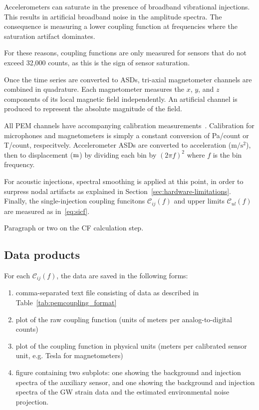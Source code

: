 Accelerometers can saturate in the presence of broadband vibrational injections.
This results in artificial broadband noise in the amplitude spectra.
The consequence is measuring a lower coupling function at frequencies where the saturation artifact dominates.

For these reasons, coupling functions are only measured for sensors that do not exceed 32,000 counts, as this is the sign of sensor saturation.

Once the time series are converted to \acp{ASD}, tri-axial magnetometer channels are combined in quadrature.
Each magnetometer measures the $x$, $y$, and $z$ components of its local magnetic field independently.
An artificial channel is produced to represent the absolute magnitude of the field.

All \ac{PEM} channels have accompanying calibration measurements~\citep{PEM_website}. Calibration for microphones and magnetometers is simply a constant conversion of Pa/count or T/count, respecitvely.
Accelerometer \acp{ASD} are converted to acceleration ($\mathrm{m/s^2}$), then to displacement ($\meter$) by dividing each bin by $(2\pi f)^2$ where $f$ is the bin frequency.

For acoustic injections, spectral smoothing is applied at this point, in order to surpress nodal artifacts as explained in Section~\ref{sec:hardware-limitations}.
Finally, the single-injection coupling funcitons $\mathcal{C}_{ij}(f)$ and upper limits $\mathcal{C}_{ul}(f)$ are measured as in~\cref{eq:sicf}.

{\color{red}
Paragraph or two on the CF calculation step.}

\subsection{Data products}

For each $\mathcal{C}_{ij}(f)$, the data are saved in the following forms:
\begin{enumerate}
	\item comma-separated text file consisting of data as described in Table~\ref{tab:pemcoupling_format}
	\item plot of the  raw coupling function (units of meters per analog-to-digital counts)
	\item plot of the coupling function in physical units (meters per calibrated sensor unit, e.g. Tesla for magnetometers)
	\item figure containing two subplots: one showing the background and injection spectra of the auxiliary sensor, and one showing the background and injection spectra of the \ac{GW} strain data and the estimated environmental noise projection.
\end{enumerate}

